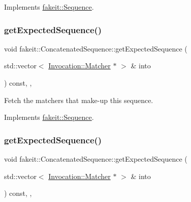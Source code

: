 Implements \mbox{\hyperlink{classfakeit_1_1Sequence_aa1a1e4ad2fcac3379ba38f250bf06884}{fakeit\+::\+Sequence}}.

\mbox{\label{classfakeit_1_1ConcatenatedSequence_a176b1d4dac2e552f646c2c3ce98f0d1f}} 
\subsubsection{\texorpdfstring{getExpectedSequence()}{getExpectedSequence()}\hspace{0.1cm}{\footnotesize\ttfamily [3/9]}}
{\footnotesize\ttfamily void fakeit\+::\+Concatenated\+Sequence\+::get\+Expected\+Sequence (\begin{DoxyParamCaption}\item[{std\+::vector$<$ \mbox{\hyperlink{structfakeit_1_1Invocation_1_1Matcher}{Invocation\+::\+Matcher}} $\ast$ $>$ \&}]{into }\end{DoxyParamCaption}) const\hspace{0.3cm}{\ttfamily [inline]}, {\ttfamily [override]}, {\ttfamily [virtual]}}



Fetch the matchers that make-\/up this sequence. 



Implements \mbox{\hyperlink{classfakeit_1_1Sequence_aa1a1e4ad2fcac3379ba38f250bf06884}{fakeit\+::\+Sequence}}.

\mbox{\label{classfakeit_1_1ConcatenatedSequence_a176b1d4dac2e552f646c2c3ce98f0d1f}} 
\subsubsection{\texorpdfstring{getExpectedSequence()}{getExpectedSequence()}\hspace{0.1cm}{\footnotesize\ttfamily [4/9]}}
{\footnotesize\ttfamily void fakeit\+::\+Concatenated\+Sequence\+::get\+Expected\+Sequence (\begin{DoxyParamCaption}\item[{std\+::vector$<$ \mbox{\hyperlink{structfakeit_1_1Invocation_1_1Matcher}{Invocation\+::\+Matcher}} $\ast$ $>$ \&}]{into }\end{DoxyParamCaption}) const\hspace{0.3cm}{\ttfamily [inline]}, {\ttfamily [override]}, {\ttfamily [virtual]}}



